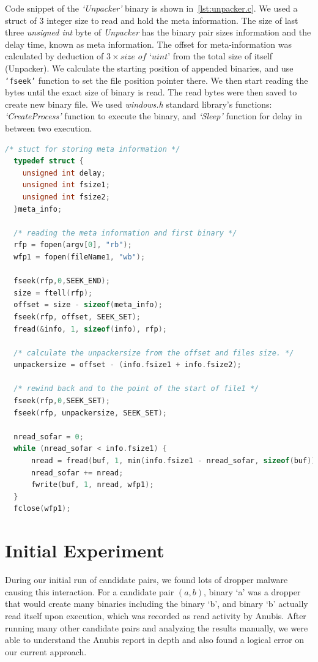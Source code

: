 Code snippet of the \emph{`Unpacker'} binary is shown in~\autoref{lst:unpacker.c}.
We used a struct of 3 integer size to read and hold the meta information. The size of last three \textit{unsigned int} byte of \emph{Unpacker} has the binary pair sizes information and the delay time, known as meta information.
The offset for meta-information was calculated by deduction of $3 \times \textit{size of `uint'}$ from the total size of itself (Unpacker).
We calculate the starting position of appended binaries, and use \texttt{`fseek\(\)'} function to set the file position pointer there.
We then start reading the bytes until the exact size of binary is read.
The read bytes were then saved to create new binary file.
We used \emph{windows.h} standard library's functions: \emph{`CreateProcess'} function to execute the binary, and \emph{`Sleep'} function for delay in between two execution.\\

\begin{lstlisting}[language=c,caption={snippet of Unpacker.c file}, label={lst:unpacker.c}]
  /* stuct for storing meta information */
  typedef struct {
    unsigned int delay;
    unsigned int fsize1;
    unsigned int fsize2;
  }meta_info;

  /* reading the meta information and first binary */
  rfp = fopen(argv[0], "rb");
  wfp1 = fopen(fileName1, "wb");

  fseek(rfp,0,SEEK_END);
  size = ftell(rfp);
  offset = size - sizeof(meta_info);
  fseek(rfp, offset, SEEK_SET);
  fread(&info, 1, sizeof(info), rfp);

  /* calculate the unpackersize from the offset and files size. */
  unpackersize = offset - (info.fsize1 + info.fsize2);

  /* rewind back and to the point of the start of file1 */
  fseek(rfp,0,SEEK_SET);
  fseek(rfp, unpackersize, SEEK_SET);

  nread_sofar = 0;
  while (nread_sofar < info.fsize1) {
      nread = fread(buf, 1, min(info.fsize1 - nread_sofar, sizeof(buf)), rfp);
      nread_sofar += nread;
      fwrite(buf, 1, nread, wfp1);
  }
  fclose(wfp1);
 \end{lstlisting}
\section{Initial Experiment}
\label{sec:Initial Experiment}
During our initial run of candidate pairs, we found lots of dropper malware causing this interaction.
For a candidate pair $(a,b)$, binary `a' was a dropper that would create many binaries including the binary `b', and binary `b' actually read itself upon execution, which was recorded as read activity by Anubis.
After running many other candidate pairs and analyzing the results manually, we were able to understand the Anubis report in depth and also found a logical error on our current approach.\\


